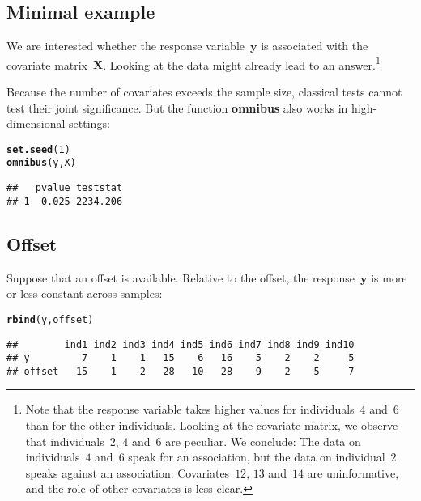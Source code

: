 \documentclass{article}\usepackage[]{graphicx}\usepackage[]{color}
\makeatletter
\newcommand{\hlnum}[1]{\textcolor[rgb]{0.686,0.059,0.569}{#1}}%
\newcommand{\hlstd}[1]{\textcolor[rgb]{0.345,0.345,0.345}{#1}}%
\newcommand{\hlkwd}[1]{\textcolor[rgb]{0.737,0.353,0.396}{\textbf{#1}}}%
\newenvironment{kframe}{%
 \def\at@end@of@kframe{}%
 \ifinner\ifhmode%
  \def\at@end@of@kframe{\end{minipage}}%
  \begin{minipage}{\columnwidth}%
 \fi\fi%
 \def\FrameCommand##1{\hskip\@totalleftmargin \hskip-\fboxsep
 \colorbox{shadecolor}{##1}\hskip-\fboxsep
     \hskip-\linewidth \hskip-\@totalleftmargin \hskip\columnwidth}%
 \MakeFramed {\advance\hsize-\width
   \@totalleftmargin\z@ \linewidth\hsize
   \@setminipage}}%
 {\par\unskip\endMakeFramed%
 \at@end@of@kframe}
\newenvironment{knitrout}{}{} %
\makeatother
\begin{document}
\subsection{Minimal example}
\label{TOA Minimal example}

We are interested whether the response variable~$\boldsymbol{y}$ is associated with the covariate matrix~$\boldsymbol{X}$. Looking at the data might already lead to an answer.\footnote{Note that the response variable takes higher values for individuals~$4$ and~$6$ than for the other individuals. Looking at the covariate matrix, we observe that individuals~$2$, $4$ and~$6$ are peculiar.
We conclude: The data on individuals~$4$ and~$6$ speak for an association, but the data on individual~$2$ speaks against an association. Covariates~$12$, $13$ and~$14$ are uninformative, and the role of other covariates is less clear.}

Because the number of covariates exceeds the sample size, classical tests cannot test their joint significance. But the function \textbf{omnibus} also works in high-dimensional settings:
\begin{knitrout}
\color{fgcolor}\begin{kframe}
\begin{alltt}
\hlkwd{set.seed}\hlstd{(}\hlnum{1}\hlstd{)}
\hlkwd{omnibus}\hlstd{(y,X)}
\end{alltt}
\begin{verbatim}
##   pvalue teststat
## 1  0.025 2234.206
\end{verbatim}
\end{kframe}
\end{knitrout}

\newpage

\subsection{Offset}
\label{TOA Offset}

Suppose that an offset is available. Relative to the offset, the response~$\boldsymbol{y}$ is more or less constant across samples:
\begin{knitrout}
\color{fgcolor}\begin{kframe}
\begin{alltt}
\hlkwd{rbind}\hlstd{(y,offset)}
\end{alltt}
\begin{verbatim}
##        ind1 ind2 ind3 ind4 ind5 ind6 ind7 ind8 ind9 ind10
## y         7    1    1   15    6   16    5    2    2     5
## offset   15    1    2   28   10   28    9    2    5     7
\end{verbatim}
\end{kframe}
\end{knitrout}
\end{document}
